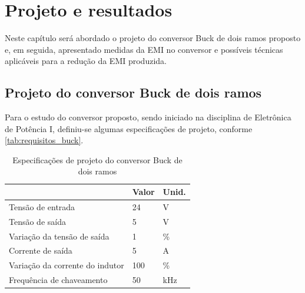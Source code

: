 
\chapter{Projeto e resultados}
\label{cap:resultados}

Neste capítulo será abordado o projeto do conversor Buck \interleaved de dois ramos proposto e, em seguida, apresentado medidas da EMI no conversor e possíveis técnicas aplicáveis para a redução da EMI produzida. 
    
    \section{Projeto do conversor Buck \Interleaved de dois ramos} \label{cap:result_proj}
    
    Para o estudo do conversor proposto, sendo iniciado na disciplina de Eletrônica de Potência I, definiu-se algumas especificações de projeto, conforme \autoref{tab:requisitos_buck}.
        
    \begin{table}[htbp]
        \centering
        \caption{Especificações de projeto do conversor Buck \Interleaved de dois ramos}
        \label{tab:requisitos_buck}
        \begin{tabular}{@{}|m{}|m{}|m{}|@{}}
            \hline
             & Valor & Unid. \\
            \hline
            Tensão de entrada               & 24    & \si{\volt}      \\ \hline
            Tensão de saída                 & 5     & \si{\volt}      \\ \hline
            Variação da tensão de saída     & 1     & \si{\percent}    \\ \hline
            Corrente de saída               & 5     & \si{\ampere}     \\ \hline
            Variação da corrente do indutor & 100   & \si{\percent}    \\ \hline
            Frequência de chaveamento       & 50    & \si{\kilo\hertz} \\ \hline
        \end{tabular}
    \end{table}
    
